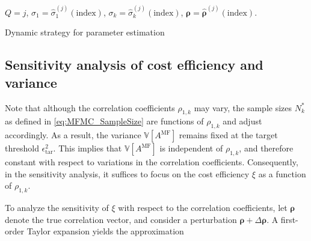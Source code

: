 \begin{algorithm}[!ht]
{{    
    {
    }
    }
    
    
    }    
    
    $Q=j$, $\sigma_1 = \widehat\sigma_1^{(j)}(\text{index})$, $\sigma_k = \widehat\sigma_k^{(j)}(\text{index})$, $\boldsymbol{\rho} = \widehat{\boldsymbol{\rho}}^{(j)}(\text{index})$.
\caption{Dynamic strategy for parameter estimation}\label{algo:Parameter_Estimation}
\end{algorithm}


\subsection{Sensitivity analysis of cost efficiency and variance}
Note that although the correlation coefficients $\rho_{1,k}$ may vary, the sample sizes $N_k^*$ as defined in \eqref{eq:MFMC_SampleSize} are functions of $\rho_{1,k}$ and adjust accordingly. As a result, the variance $\mathbb{V}\left[A^{\text{MF}}\right]$ remains fixed at the target threshold $\epsilon_{\text{tar}}^2$. This implies that $\mathbb{V}\left[A^{\text{MF}}\right]$ is independent of $\rho_{1,k}$, and therefore constant with respect to variations in the correlation coefficients. Consequently, in the sensitivity analysis, it suffices to focus on the cost efficiency $\xi$ as a function of $\rho_{1,k}$.

To analyze the sensitivity of $\xi$ with respect to the correlation coefficients, let $\boldsymbol{\rho}$ denote the true correlation vector, and consider a perturbation $\boldsymbol{\rho} + \Delta \boldsymbol{\rho}$. A first-order Taylor expansion yields the approximation

